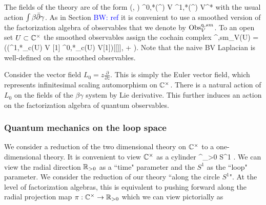 \documentclass[10pt]{amsart}
\def\brian{\textcolor{blue}{BW: }\textcolor{blue}}
\begin{document}
The fields of the theory are of the form
\ben
(\gamma, \beta) \in \Omega^{0,*}(\CC^\times) \tensor V \oplus \Omega^{1,*}(\CC^\times) \tensor V^*
\een
with the usual action $\int \beta \Bar{\partial} \gamma$. 
As in Section \brian{ref} it is convenient to use a smoothed version of the factorization algebra of observables that we denote by ${\rm Obs}_V^{{\rm q}, sm}$. 
To an open set $U \subset \mathbb C^\times$ the smoothed observables assign the cochain complex
\ben
{\Obs}^{\q,sm}_V(U) = (\Sym(\Omega^{1,*}_c(U) \otimes V [1] \oplus \Omega^{0,*}_c(U) \otimes V[1])[[\hbar]], \dbar + \hbar \Delta). 
\een
Note that the naive BV Laplacian is well-defined on the smoothed observables. 

Consider the vector field $L_0 = z \frac{\partial}{\partial z}$. 
This is simply the Euler vector field, which represents infinitesimal scaling automorphism on $\mathbb C^\times$.
There is a natural action of $L_0$ on the fields of the $\beta\gamma$ system by Lie derivative.
This further induces an action on the factorization algebra of quantum observables.

\subsubsection{Quantum mechanics on the loop space}

We consider a reduction of the two dimensional theory on $\mathbb C^\times$ to a one-dimensional theory.
It is convenient to view $\mathbb C^\times$ as a cylinder
\ben
\CC^\times \cong \RR_{>0} \times S^1 .
\een
We can view the radial direction $\mathbb R_{>0}$ as a ``time" parameter and the $S^1$ as the ``loop" parameter. 
We consider the reduction of our theory ``along the circle $S^1$". 
At the level of factorization algebras, this is equivalent to pushing forward along the radial projection map $\pi : \mathbb C^\times \to \mathbb R_{>0}$ which we can view pictorially as
\ben
{}
\een
\end{document}
